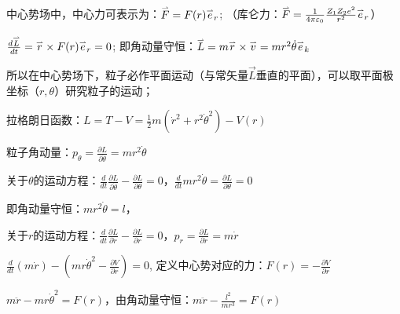 中心势场中，中心力可表示为：$\mathord{\buildrel{\lower3pt\hbox{$\scriptscriptstyle\rightharpoonup$}}
\over F}  = F(r)\mathord{\buildrel{\lower3pt\hbox{$\scriptscriptstyle\rightharpoonup$}}
\over e} _r $; （库仑力：$\mathord{\buildrel{\lower3pt\hbox{$\scriptscriptstyle\rightharpoonup$}}
\over F}  = \frac{1}{{4\pi \varepsilon _0 }}\frac{{Z_1 Z_2 e^2 }}{{r^2 }}\mathord{\buildrel{\lower3pt\hbox{$\scriptscriptstyle\rightharpoonup$}}
\over e} _r $）


$\frac{{d\mathord{\buildrel{\lower3pt\hbox{$\scriptscriptstyle\rightharpoonup$}}
\over L} }}{{dt}} = \mathord{\buildrel{\lower3pt\hbox{$\scriptscriptstyle\rightharpoonup$}}
\over r}  \times F(r)\mathord{\buildrel{\lower3pt\hbox{$\scriptscriptstyle\rightharpoonup$}}
\over e} _r  = 0$;
即角动量守恒：$\mathord{\buildrel{\lower3pt\hbox{$\scriptscriptstyle\rightharpoonup$}}
\over L}  = m\mathord{\buildrel{\lower3pt\hbox{$\scriptscriptstyle\rightharpoonup$}}
\over r}  \times \mathord{\buildrel{\lower3pt\hbox{$\scriptscriptstyle\rightharpoonup$}}
\over v}  = mr^2 \dot \theta \mathord{\buildrel{\lower3pt\hbox{$\scriptscriptstyle\rightharpoonup$}}
\over e} _k $

所以在中心势场下，粒子必作平面运动（与常矢量$\vec L$垂直的平面），可以取平面极坐标（$r,\theta $）研究粒子的运动；

拉格朗日函数：$L = T - V = \frac{1}{2}m\left( {\dot r^2  + r^2 \dot \theta ^2 } \right) - V(r)$

粒子角动量：$p_\theta   = \frac{{\partial L}}{{\partial \dot \theta }} = mr^2 \dot \theta $

关于$\theta $的运动方程：$\frac{d}{{dt}}\frac{{\partial L}}{{\partial \dot \theta }} - \frac{{\partial L}}{{\partial \theta }} = 0$，$\frac{d}{{dt}}mr^2 \dot \theta  = \frac{{\partial L}}{{\partial \theta }} = 0$

即角动量守恒：$mr^2 \dot \theta  = l$，

关于$r$的运动方程：$\frac{d}{{dt}}\frac{{\partial L}}{{\partial \dot r}} - \frac{{\partial L}}{{\partial r}} = 0$，$p_r  = \frac{{\partial L}}{{\partial \dot r}} = m\dot r$

$\frac{d}{{dt}}\left( {m\dot r} \right) - \left( {mr\dot \theta ^2  - \frac{{\partial V}}{{\partial r}}} \right) = 0$, 定义中心势对应的力：$F(r) =  - \frac{{\partial V}}{{\partial r}}$


$m\ddot r - mr\dot \theta ^2  = F(r)$，由角动量守恒：$m\ddot r - \frac{{l^2 }}{{mr^3 }} = F(r)$

